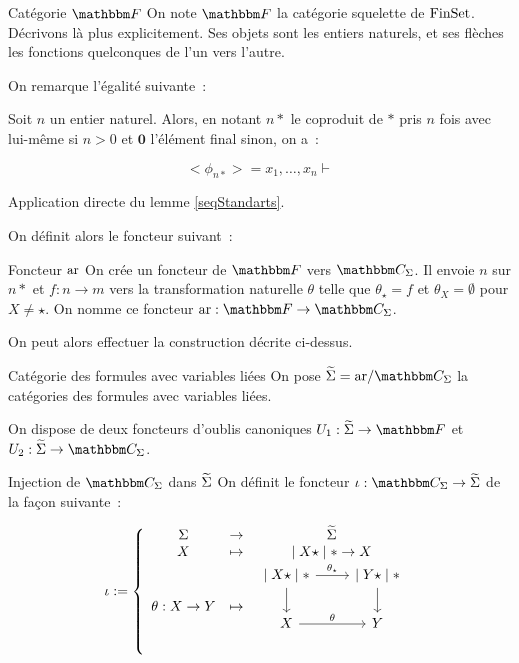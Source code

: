 \begin{defi}{Catégorie $\cf$}
    On note $\cf$ la catégorie squelette de $\text{FinSet}$. Décrivons là plus explicitement.
    Ses objets sont les entiers naturels, et ses flèches les fonctions quelconques
    de l'un vers l'autre.
\end{defi}

On remarque l'égalité suivante~:

\begin{lem}
    Soit $n$ un entier naturel. Alors, en notant $n\ast$ le coproduit de $\ast$ pris
    $n$ fois avec lui-même si $n>0$ et $\mathbf{0}$ l'élément final sinon, on
    a~:

    \[ <\phi_{n\ast}> = x_1,\dots, x_n\vdash \]
\end{lem}

\begin{pv}
    Application directe du lemme \ref{seqStandarts}.
\end{pv}

On définit alors le foncteur suivant~:

\begin{defi}{Foncteur $\text{ar}$}
    On crée un foncteur de $\cf$ vers $\C_\Sigma$. Il envoie $n$ sur $n\ast$ et
    $f : n\rightarrow m$ vers la transformation naturelle $\theta$ telle que
    $\theta_\star = f$ et $\theta_X = \emptyset$ pour $X\neq\star$. On nomme ce
    foncteur $\arf : \cf\rightarrow\C_\Sigma$.
\end{defi}

On peut alors effectuer la construction décrite ci-dessus.

\begin{defi}{Catégorie des formules avec variables liées}
    On pose $\tsigma = \arf/\C_\Sigma$ la catégories des formules avec variables
    liées.

    On dispose de deux foncteurs d'oublis canoniques $U_1 : \tsigma\rightarrow\cf$
    et $U_2 : \tsigma\rightarrow\C_\Sigma$.
\end{defi}

\begin{defi}{Injection de $\C_\Sigma$ dans $\widetilde{\Sigma}$}
    On définit le foncteur $\iota:\C_\Sigma\rightarrow\tsigma$ de la façon suivante~:

    \[ \iota := \left\{\begin{array}{ccc}
        \Sigma & \rightarrow & \tsigma \\
        X      & \mapsto     & \mid X\star\mid\ast\rightarrow X \\
        \theta : X\rightarrow Y & \mapsto &
            \begin{tikzcd}
                \mid X\star\mid\ast\arrow[d]
                                   \arrow[r, "\theta_\star"]
                    & \mid Y\star\mid\ast\arrow[d] \\
                X\arrow[r, "\theta"]
                    & Y \\
            \end{tikzcd} \\
    \end{array}\right. \]
\end{defi}

